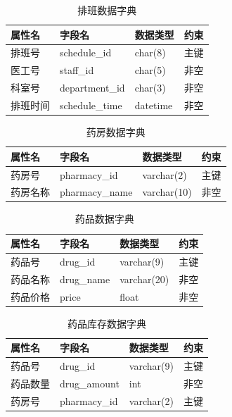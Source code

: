 \documentclass{article}
\begin{document}
\begin{table}[H]
    \centering
    \begin{tabularx}{\textwidth}{|p{2.2cm}|p{3.2cm}|p{4.8cm}|p{5cm}|}
    \toprule
    \textbf{属性名} & \textbf{字段名} & \textbf{数据类型} & \textbf{约束} \\ \midrule
    排班号 & schedule\_id & char(8) & 主键 \\ \midrule
    医工号 & staff\_id & char(5) & 非空 \\ \midrule
    科室号 & department\_id & char(3) & 非空 \\ \midrule
    排班时间 & schedule\_time & datetime & 非空 \\
    \bottomrule
    \end{tabularx}
    \caption{排班数据字典}
    \label{tab:schedule}
\end{table}

\begin{table}[H]
    \centering
    \begin{tabularx}{\textwidth}{|p{2.2cm}|p{3.2cm}|p{4.8cm}|p{5cm}|}
    \toprule
    \textbf{属性名} & \textbf{字段名} & \textbf{数据类型} & \textbf{约束} \\ \midrule
    药房号 & pharmacy\_id & varchar(2) & 主键 \\ \midrule
    药房名称 & pharmacy\_name & varchar(10) & 非空 \\ \bottomrule
    \end{tabularx}
    \caption{药房数据字典}
    \label{tab:pharmacy}
\end{table}

\begin{table}[H]
    \centering
    \begin{tabularx}{\textwidth}{|p{2.2cm}|p{3.2cm}|p{4.8cm}|p{5cm}|}
    \toprule
    \textbf{属性名} & \textbf{字段名} & \textbf{数据类型} & \textbf{约束} \\ \midrule
    药品号 & drug\_id & varchar(9) & 主键 \\ \midrule
    药品名称 & drug\_name & varchar(20) & 非空 \\ \midrule
    药品价格 & price & float & 非空 \\ \bottomrule
    \end{tabularx}
    \caption{药品数据字典}
    \label{tab:drug}
\end{table}

\begin{table}[H]
    \centering
    \begin{tabularx}{\textwidth}{|p{2.2cm}|p{3.2cm}|p{4.8cm}|p{5cm}|}
    \toprule
    \textbf{属性名} & \textbf{字段名} & \textbf{数据类型} & \textbf{约束} \\ \midrule
    药品号 & drug\_id & varchar(9) & 主键 \\ \midrule
    药品数量 & drug\_amount & int & 非空 \\ \midrule
    药房号 & pharmacy\_id & varchar(2) & 主键 \\ \bottomrule
    \end{tabularx}
    \caption{药品库存数据字典}
    \label{tab:drug_storage}
\end{table}
\end{document}
